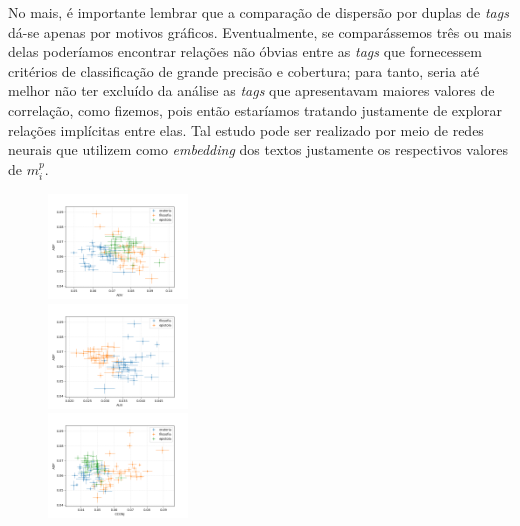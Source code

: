\documentclass[10pt,a4paper,onecolumn]{article}
\theoremstyle{definition}
\theoremstyle{remark}
\begin{document}
No mais, é importante lembrar que a comparação de dispersão por duplas de \emph{tags} dá-se apenas por motivos gráficos. Eventualmente, se comparássemos três ou mais delas poderíamos encontrar relações não óbvias entre as \emph{tags} que fornecessem critérios de classificação de grande precisão e cobertura; para tanto, seria até melhor não ter excluído da análise as \emph{tags} que apresentavam maiores valores de correlação, como fizemos, pois então estaríamos tratando justamente de explorar relações implícitas entre elas. Tal estudo pode ser realizado por meio de redes neurais que utilizem como \emph{embedding} dos textos justamente os respectivos valores de $m_i^p$.%

\begin{figure}[htpb!]
	\centering
	\begin{multicols}{3}
		\includegraphics[width=0.33\textwidth]{graficos/ADP_x_ADV.png}  \\
		\includegraphics[width=0.33\textwidth]{graficos/ADP_x_AUX.png}  \\
		\includegraphics[width=0.33\textwidth]{graficos/ADP_x_CCONJ.png}  \\
	\end{multicols}\vspace{-0.8cm}

\end{figure}
\end{document}
